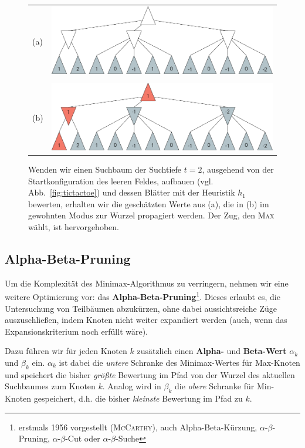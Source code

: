 \documentclass[a4paper]{scrartcl}
\newcommand\q[1]{\glqq #1\grqq}
\begin{document}
\begin{figure}[!ht]
  \centering
  \begin{tabular}{ll}
    (a) & \includegraphics[width=.8\textwidth]{minmax_heuristik.pdf}\\
        & \\
    (b) & \includegraphics[width=.8\textwidth]{minmax_heuristik_2.pdf}
  \end{tabular}
  \caption{Wenden wir einen Suchbaum der Suchtiefe $t = 2$, ausgehend von der Startkonfiguration des leeren Feldes, aufbauen (vgl. Abb.~\ref{fig:tictactoe}) und dessen Blätter mit der Heuristik $h_1$ bewerten, erhalten wir die geschätzten Werte aus (a), die in (b) im gewohnten Modus zur Wurzel propagiert werden. Der Zug, den \textsc{Max} wählt, ist hervorgehoben.\label{fig:heuristic}}
\end{figure}


\subsection{Alpha-Beta-Pruning}

Um die Komplexität des Minimax-Algorithmus zu verringern, nehmen wir eine weitere Optimierung vor: das \textbf{Alpha-Beta-Pruning}\footnote{erstmals 1956 vorgestellt (\textsc{McCarthy}), auch \q{Alpha-Beta-Kürzung}, \q{$\alpha$-$\beta$-Pruning}, \q{$\alpha$-$\beta$-Cut} oder \q{$\alpha$-$\beta$-Suche}}. Dieses erlaubt es, die Untersuchung von Teilbäumen abzukürzen, ohne dabei aussichtsreiche Züge auszuschließen, indem Knoten nicht weiter expandiert werden (auch, wenn das Expansionskriterium noch erfüllt wäre). 

Dazu führen wir für jeden Knoten $k$ zusätzlich einen \textbf{Alpha-} und \textbf{Beta-Wert} $\alpha_k$ und $\beta_k$ ein. $\alpha_k$ ist dabei die \textit{untere} Schranke des Minimax-Wertes für Max-Knoten und speichert die bisher \textit{größte} Bewertung im Pfad von der Wurzel des aktuellen Suchbaumes zum Knoten $k$. Analog wird in $\beta_k$ die \textit{obere} Schranke für Min-Knoten gespeichert, d.h. die bisher \textit{kleinste} Bewertung im Pfad zu $k$.
\end{document}
